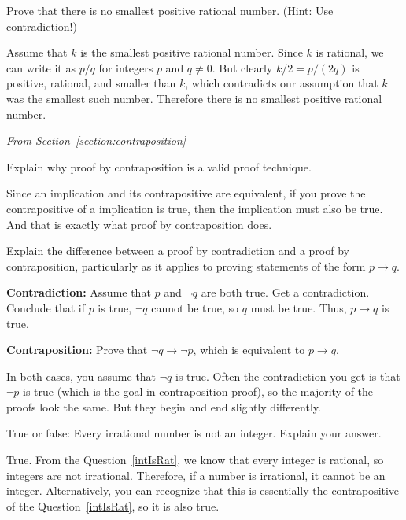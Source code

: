 {\begin{requ}
Prove that there is no smallest positive rational number.
(Hint: Use contradiction!)
\begin{requanswer}
Assume that $k$ is the smallest positive rational number.
Since $k$ is rational, we can write it as $p/q$ for integers
$p$ and $q\neq 0$. But clearly $k/2=p/(2q)$ is positive,
rational, and smaller than $k$, which contradicts our assumption
that $k$ was the smallest such number.
Therefore there is no smallest positive rational number.
\end{requanswer}
\end{requ}

\medskip
 
\noindent
{\em From Section~\ref{section:contraposition}

\begin{requ}
Explain why proof by contraposition is a valid proof technique.
\begin{requanswer}
Since an implication and its contrapositive are equivalent, if you prove the contrapositive of a implication is
true, then the implication must also be true. And that is exactly what proof by contraposition does.
\end{requanswer}
\end{requ}

\begin{requ}
Explain the difference between a proof by contradiction and a proof by contraposition, particularly
as it applies to proving statements of the form $p\rightarrow q$.
\begin{requanswer}
{\bf Contradiction:} Assume that $p$ and $\neg q$ are both true. Get a contradiction.
Conclude that if $p$ is true, $\neg q$ cannot be true, so $q$ must be true. Thus, $p\rightarrow q$ is true. 

\noindent
{\bf Contraposition: } Prove that $\neg q\rightarrow \neg p$, which is equivalent to $p\rightarrow q$.

\noindent
In both cases, you assume that $\neg q$ is true. Often the contradiction you get is that $\neg p$
is true (which is the goal in contraposition proof), 
so the majority of the proofs look the same. But they begin and end slightly differently.
\end{requanswer}
\end{requ}


\begin{requ}
True or false: Every irrational number is not an integer. Explain your answer.
\begin{requanswer}
True. From the Question~\ref{intIsRat}, we know that every integer is rational, so integers are not irrational. 
Therefore, if a number is irrational, it cannot be an integer.
Alternatively, you can recognize that this is essentially the contrapositive of the Question~\ref{intIsRat}, so it is also true.
\end{requanswer}
\end{requ}

}}
